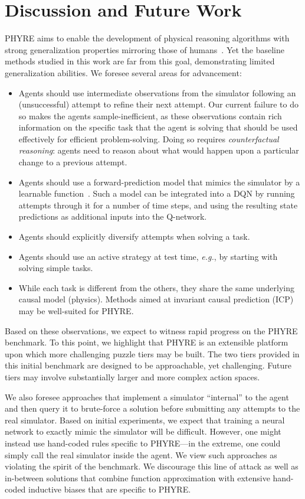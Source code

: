 \documentclass{article}
\begin{document}
\section{Discussion and Future Work}
\label{sec:discussion}
PHYRE aims to enable the development of physical reasoning algorithms with strong generalization properties mirroring those of humans~\cite{martin2008tubes}. Yet the baseline methods studied in this work are far from this goal, demonstrating limited generalization abilities. We foresee several areas for advancement:
\begin{itemize}[leftmargin=*]
\setlength\itemsep{0em}
\item Agents should use intermediate observations from the simulator following an (unsuccessful) attempt to refine their next attempt. Our current failure to do so makes the agents sample-inefficient, as these observations contain rich information on the specific task that the agent is solving that should be used effectively for efficient problem-solving. Doing so requires \emph{counterfactual reasoning}: agents need to reason about what would happen upon a particular change to a previous attempt.
\item Agents should use a forward-prediction model that mimics the simulator by a learnable function~\cite{henaff2017prediction}. Such a model can be integrated into a DQN by running attempts through it for a number of time steps, and using the resulting state predictions as additional inputs into the Q-network.
\item Agents should explicitly diversify attempts when solving a task.
\item Agents should use an active strategy at test time, \emph{e.g.}, by starting with solving simple tasks. 
\item While each task is different from the others, they share the same underlying causal model (physics). Methods aimed at invariant causal prediction (ICP)~\cite{heinze2018invariant,peters2014causal} may be well-suited for PHYRE.
\end{itemize}
Based on these observations, we expect to witness rapid progress on the PHYRE benchmark. To this point, we highlight that PHYRE is an extensible platform upon which more challenging puzzle tiers may be built. The two tiers provided in this initial benchmark are designed to be approachable, yet challenging. Future tiers may involve substantially larger and more complex action spaces. 

We also foresee approaches that implement a simulator ``internal'' to the agent and then query it to brute-force a solution before submitting any attempts to the real simulator. Based on initial experiments, we expect that training a neural network to exactly mimic the simulator will be difficult. However, one might instead use hand-coded rules specific to PHYRE---in the extreme, one could simply call the real simulator inside the agent. We view such approaches as violating the spirit of the benchmark.  We discourage this line of attack as well as in-between solutions that combine function approximation with extensive hand-coded inductive biases that are specific to PHYRE.
 
\end{document}
